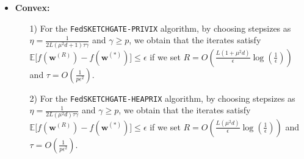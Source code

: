 \begin{theorem}
\begin{itemize}
     \item \textbf{Convex:}
     \begin{itemize}
         \item[1)]For the \texttt{FedSKETCHGATE-PRIVIX} algorithm, by choosing stepsizes as $\eta=\frac{1}{2L\left(\mu^2d+1\right)\tau\gamma}$ and $\gamma\geq p$, we obtain that the iterates satisfy $ \mathbb{E}\Big[f({\boldsymbol{w}}^{(R)})-f({\boldsymbol{w}}^{(*)})\Big]\leq \epsilon$ if we set
     $R=O\left(\frac{L\left(1+\mu^2d\right)}{\epsilon}\log\left(\frac{1}{\epsilon}\right)\right)$ and $ \tau=O\left(\frac{1}{p\epsilon^2}\right).$
         \item[2)] For the \texttt{FedSKETCHGATE-HEAPRIX} algorithm,
by choosing stepsizes as $\eta=\frac{1}{2L\left(\mu^2d\right)\tau\gamma}$ and $\gamma\geq p$, we obtain that the iterates satisfy $ \mathbb{E}\Big[f({\boldsymbol{w}}^{(R)})-f({\boldsymbol{w}}^{(*)})\Big]\leq \epsilon$ if we set
     $R=O\left(\frac{L\left(\mu^2d\right)}{\epsilon}\log\left(\frac{1}{\epsilon}\right)\right)$ and $ \tau=O\left(\frac{1}{p\epsilon^2}\right).$ 
     \end{itemize}
 \end{itemize}
\end{theorem}








